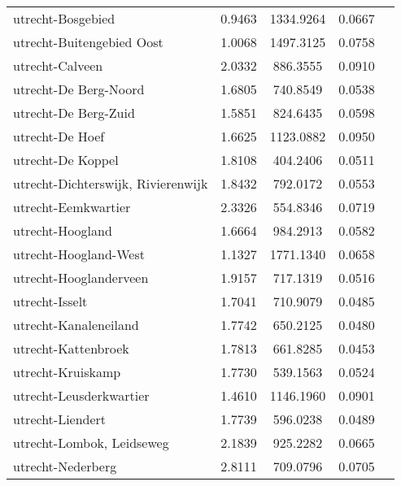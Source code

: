 \begin{longtable}{llccc}
	utrecht-Bosgebied                         & 0.9463  & 1334.9264 & 0.0667                 \\
	utrecht-Buitengebied Oost                 & 1.0068  & 1497.3125 & 0.0758                 \\
	utrecht-Calveen                           & 2.0332  & 886.3555  & 0.0910                 \\
	utrecht-De Berg-Noord                     & 1.6805  & 740.8549  & 0.0538                 \\
	utrecht-De Berg-Zuid                      & 1.5851  & 824.6435  & 0.0598                 \\
	utrecht-De Hoef                           & 1.6625  & 1123.0882 & 0.0950                 \\
	utrecht-De Koppel                         & 1.8108  & 404.2406  & 0.0511                 \\
	utrecht-Dichterswijk, Rivierenwijk        & 1.8432  & 792.0172  & 0.0553                 \\
	utrecht-Eemkwartier                       & 2.3326  & 554.8346  & 0.0719                 \\
	utrecht-Hoogland                          & 1.6664  & 984.2913  & 0.0582                 \\
	utrecht-Hoogland-West                     & 1.1327  & 1771.1340 & 0.0658                 \\
	utrecht-Hooglanderveen                    & 1.9157  & 717.1319  & 0.0516                 \\
	utrecht-Isselt                            & 1.7041  & 710.9079  & 0.0485                 \\
	utrecht-Kanaleneiland                     & 1.7742  & 650.2125  & 0.0480                 \\
	utrecht-Kattenbroek                       & 1.7813  & 661.8285  & 0.0453                 \\
	utrecht-Kruiskamp                         & 1.7730  & 539.1563  & 0.0524                 \\
	utrecht-Leusderkwartier                   & 1.4610  & 1146.1960 & 0.0901                 \\
	utrecht-Liendert                          & 1.7739  & 596.0238  & 0.0489                 \\
	utrecht-Lombok, Leidseweg                 & 2.1839  & 925.2282  & 0.0665                 \\
	utrecht-Nederberg                         & 2.8111  & 709.0796  & 0.0705                 \\

\end{longtable}

